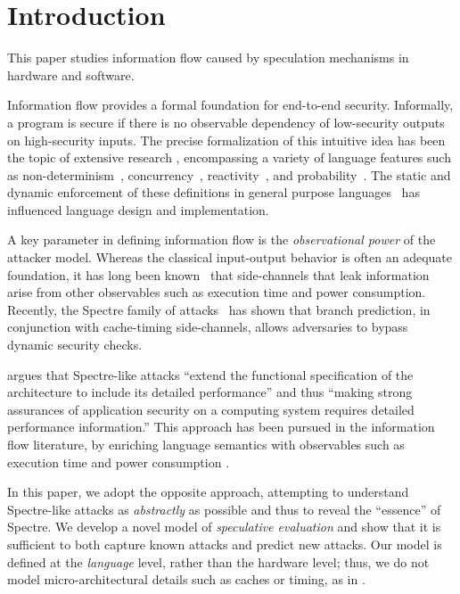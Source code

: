 \section{Introduction}

This paper studies information flow caused by speculation mechanisms
in hardware and software.

Information flow provides a formal
foundation for end-to-end security.  Informally, a program is secure
if there is no observable dependency of low-security outputs on high-security inputs.
The precise formalization of this intuitive idea has been the topic of
extensive research \cite{Sabelfeld:2006:LIS:2312191.2314769}, encompassing a variety of language
features such as non-determinism~\cite{Wittbold1990InformationFI},
concurrency~\cite{Smith:1998:SIF:268946.268975}, reactivity~\cite{O'Neill:2006:ISI:1155442.1155677}, and
probability~\cite{Gray:1992:TMF:2699806.2699811}. The static and dynamic enforcement
of these definitions in general purpose languages~\cite{myers-popl99} has %
influenced language design and implementation.

A key parameter in defining information flow is the \emph{observational power} of the attacker model. Whereas the classical
input-output behavior is often an adequate foundation,
it has long been known~\cite{Lampson:1973:NCP:362375.362389,Biswas:2017:STC:3058791.3023872} that side-channels that leak
information arise from other observables such as execution time and
power consumption.
Recently, the Spectre family of attacks~\cite{DBLP:journals/corr/abs-1801-01203} has
shown that branch prediction, in conjunction with cache-timing side-channels,
allows adversaries to bypass dynamic security checks.

\citet{Chien:2018} argues that Spectre-like attacks ``extend the functional
specification of the architecture to include its detailed performance'' and
thus ``making strong assurances of application security on a computing system
requires detailed performance information.''
This approach has been pursued in the information flow literature, by
enriching language semantics with observables such as execution time and  power consumption
\cite{Zhang:2012:LCM:2345156.2254078,hyperflow}.

In this paper, we adopt the opposite approach, attempting to understand
Spectre-like attacks as \emph{abstractly} as possible and thus to reveal the
``essence'' of Spectre.  We develop a novel model of \emph{speculative
  evaluation} and show that it is sufficient to both capture known attacks and
predict new attacks.  Our model is defined at the \emph{language} level,
rather than the hardware level; thus, we do not model micro-architectural
details such as caches or timing, as in
\cite{Zhang:2012:LCM:2345156.2254078,hyperflow}.


